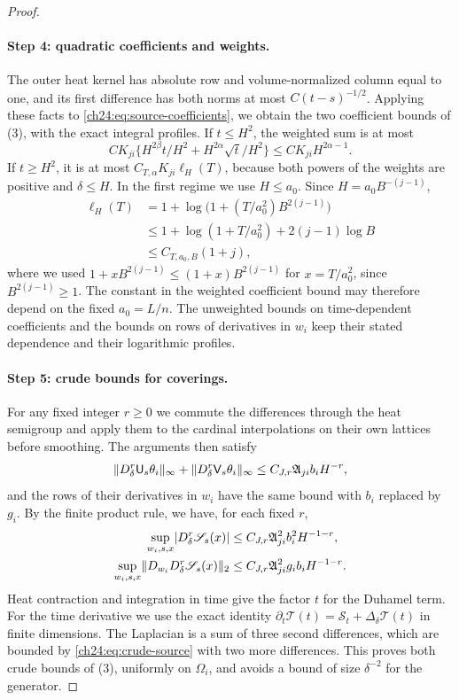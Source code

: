 \begin{proof}
\paragraph{Step 4: quadratic coefficients and weights.}
The outer heat kernel has absolute row and volume-normalized column equal to one, and its first difference has both norms at most $C(t-s)^{-1/2}$. Applying these facts to \eqref{ch24:eq:source-coefficients}, we obtain the two coefficient bounds of (3), with the exact integral profiles. If $t\le H^2$, the weighted sum is at most
\[
 CK_{ji}\{H^{2\beta}t/H^2+H^{2\alpha}\sqrt t/H^2\}\le CK_{ji}H^{2\alpha-1}.
\]
If $t\ge H^2$, it is at most $C_{T,\alpha}K_{ji}\ell_H(T)$, because both powers of the weights are positive and $\delta\le H$. In the first regime we use $H\le a_0$. Since $H=a_0B^{-(j-1)}$,
\begin{equation}\label{ch24:eq:retained-mesh-log}
 \begin{split}
 \ell_H(T)&=1+\log\bigl(1+(T/a_0^2)B^{2(j-1)}\bigr)\\
 &\le1+\log(1+T/a_0^2)+2(j-1)\log B\\
 &\le C_{T,a_0,B}(1+j),
 \end{split}
\end{equation}
where we used $1+xB^{2(j-1)}\le(1+x)B^{2(j-1)}$ for $x=T/a_0^2$, since $B^{2(j-1)}\ge1$. The constant in the weighted coefficient bound may therefore depend on the fixed $a_0=L/n$. The unweighted bounds on time-dependent coefficients and the bounds on rows of derivatives in $w_i$ keep their stated dependence and their logarithmic profiles.

\paragraph{Step 5: crude bounds for coverings.}
For any fixed integer $r\ge0$ we commute the differences through the heat semigroup and apply them to the cardinal interpolations on their own lattices before smoothing. The arguments then satisfy
\[
 \lVert D_\delta^r\mathsf U_s\theta_i\rVert_\infty+\lVert D_\delta^r\mathsf V_s\theta_i\rVert_\infty\le C_{J,r}\mathfrak A_{ji}b_iH^{-r},
\]
and the rows of their derivatives in $w_i$ have the same bound with $b_i$ replaced by $g_i$. By the finite product rule, we have, for each fixed $r$,
\begin{equation}\label{ch24:eq:crude-source}
 \begin{split}
 \sup_{w_i,s,x}\lvert D_\delta^r\mathscr S_s(x)\rvert&\le C_{J,r}\mathfrak A_{ji}^2b_i^2H^{-1-r},\\
 \sup_{w_i,s,x}\lVert D_{w_i}D_\delta^r\mathscr S_s(x)\rVert_2&\le C_{J,r}\mathfrak A_{ji}^2g_ib_iH^{-1-r}.
 \end{split}
\end{equation}
Heat contraction and integration in time give the factor $t$ for the Duhamel term. For the time derivative we use the exact identity $\partial_t\mathscr T(t)=\mathscr S_t+\Delta_\delta\mathscr T(t)$ in finite dimensions. The Laplacian is a sum of three second differences, which are bounded by \eqref{ch24:eq:crude-source} with two more differences. This proves both crude bounds of (3), uniformly on $\Omega_i$, and avoids a bound of size $\delta^{-2}$ for the generator.


\end{proof}
